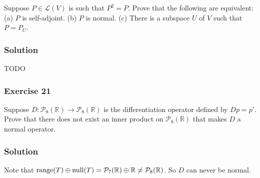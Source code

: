 Suppose $P \in \mathcal{L}(V)$ is such that $P^2 = P$.
Prove that the following are equivalent: (a) $P$ is self-adjoint. (b) $P$ is normal. (c) There is a subspace $U$ of $V$ such that $P = P_U$.

\subsubsection*{Solution}

TODO


\subsubsection*{Exercise 21}

Suppose $D: \mathcal{P}_8(\mathbb{R}) \to \mathcal{P}_8(\mathbb{R})$ is the differentiation operator defined by $Dp = p'$.
Prove that there does not exist an inner product on $\mathcal{P}_8(\mathbb{R})$ that makes $D$ a normal operator.

\subsubsection*{Solution}

Note that $\mathrm{range}(T) \oplus \mathrm{null}(T) = \mathcal{P}_7(\mathbb{R}) \oplus \mathbb{R} \neq \mathcal{P}_8(\mathbb{R})$.
So $D$ can never be normal.
